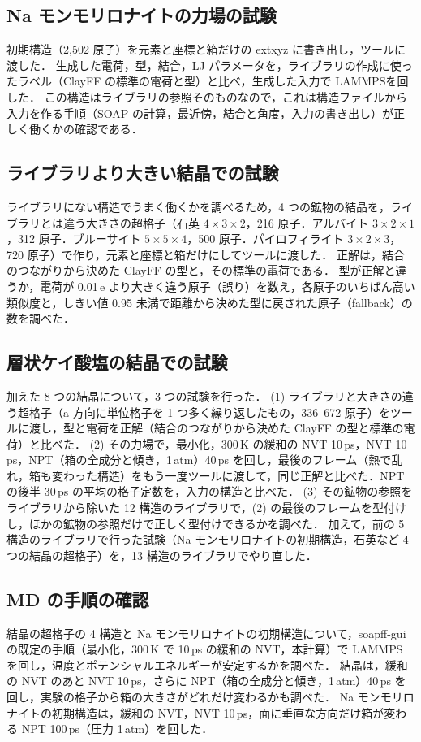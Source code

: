 \documentclass[a4paper,11pt]{article}
\newcommand{\e}{\,e}
\begin{document}
\subsection{Na モンモリロナイトの力場の試験}
初期構造（2{,}502 原子）を元素と座標と箱だけの extxyz に書き出し，ツールに渡した．
生成した電荷，型，結合，LJ パラメータを，ライブラリの作成に使ったラベル（ClayFF の標準の電荷と型）と比べ，生成した入力で LAMMPS\cite{lammps}を回した．
この構造はライブラリの参照そのものなので，これは構造ファイルから入力を作る手順（SOAP の計算，最近傍，結合と角度，入力の書き出し）が正しく働くかの確認である．

\subsection{ライブラリより大きい結晶での試験}
ライブラリにない構造でうまく働くかを調べるため，4 つの鉱物の結晶を，ライブラリとは違う大きさの超格子（石英 $4\times3\times2$，216 原子．アルバイト $3\times2\times1$，312 原子．ブルーサイト $5\times5\times4$，500 原子．パイロフィライト $3\times2\times3$，720 原子）で作り，元素と座標と箱だけにしてツールに渡した．
正解は，結合のつながりから決めた ClayFF の型と，その標準の電荷である．
型が正解と違うか，電荷が 0.01\e{} より大きく違う原子（誤り）を数え，各原子のいちばん高い類似度と，しきい値 0.95 未満で距離から決めた型に戻された原子（fallback）の数を調べた．

\subsection{層状ケイ酸塩の結晶での試験}
\label{sec:sheetmethod}
加えた 8 つの結晶について，3 つの試験を行った．
(1) ライブラリと大きさの違う超格子（a 方向に単位格子を 1 つ多く繰り返したもの，336--672 原子）をツールに渡し，型と電荷を正解（結合のつながりから決めた ClayFF の型と標準の電荷）と比べた．
(2) その力場で，最小化，300\,K の緩和の NVT 10\,ps，NVT 10\,ps，NPT（箱の全成分と傾き，1\,atm）40\,ps を回し，最後のフレーム（熱で乱れ，箱も変わった構造）をもう一度ツールに渡して，同じ正解と比べた．NPT の後半 30\,ps の平均の格子定数を，入力の構造と比べた．
(3) その鉱物の参照をライブラリから除いた 12 構造のライブラリで，(2) の最後のフレームを型付けし，ほかの鉱物の参照だけで正しく型付けできるかを調べた．
加えて，前の 5 構造のライブラリで行った試験（Na モンモリロナイトの初期構造，石英など 4 つの結晶の超格子）を，13 構造のライブラリでやり直した．

\subsection{MD の手順の確認}
結晶の超格子の 4 構造と Na モンモリロナイトの初期構造について，soapff-gui の既定の手順（最小化，300\,K で 10\,ps の緩和の NVT，本計算）で LAMMPS を回し，温度とポテンシャルエネルギーが安定するかを調べた．
結晶は，緩和の NVT のあと NVT 10\,ps，さらに NPT（箱の全成分と傾き，1\,atm）40\,ps を回し，実験の格子から箱の大きさがどれだけ変わるかも調べた．
Na モンモリロナイトの初期構造は，緩和の NVT，NVT 10\,ps，面に垂直な方向だけ箱が変わる NPT 100\,ps（圧力 1\,atm）を回した．
\end{document}
